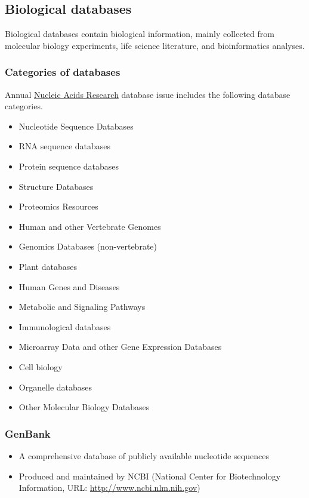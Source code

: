 %
%

%
%
\subsection{Biological databases}
Biological databases contain biological information, mainly collected from molecular biology experiments, life science literature, and bioinformatics analyses.

%
%
\subsubsection*{Categories of databases} 
Annual \href{http://nar.oxfordjournals.org}{Nucleic Acids Research} database issue includes the following database categories.

\begin{itemize}
\item Nucleotide Sequence Databases
\item RNA sequence databases
\item Protein sequence databases
\item Structure Databases
\item Proteomics Resources
\item Human and other Vertebrate Genomes
\item Genomics Databases (non-vertebrate)
\item Plant databases
\item Human Genes and Diseases
\item Metabolic and Signaling Pathways
\item Immunological databases
\item Microarray Data and other Gene Expression Databases
\item Cell biology
\item Organelle databases
\item Other Molecular Biology Databases
\end{itemize}

%
%
\subsubsection*{GenBank} 
\begin{itemize}
\item A comprehensive database of publicly available nucleotide sequences
\item Produced and maintained by NCBI (National Center for Biotechnology Information, URL: \href{http://www.ncbi.nlm.nih.gov}{http://www.ncbi.nlm.nih.gov})
\end{itemize}


